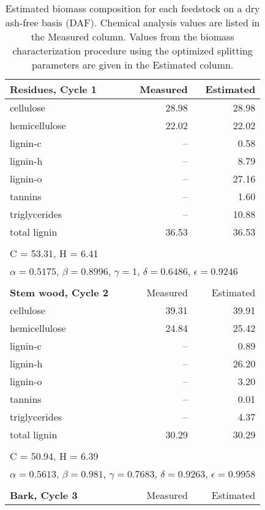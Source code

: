 \begin{longtable}{p{8cm}rr}
    \caption{Estimated biomass composition for each feedstock on a dry ash-free basis (DAF). Chemical analysis values are listed in the Measured column. Values from the biomass characterization procedure using the optimized splitting parameters are given in the Estimated column.}
    \label{tab:biocomp3} \\
    \textbf{Residues, Cycle 1} & Measured & Estimated \\
    \midrule
    cellulose       & 28.98  & 28.98 \\
    hemicellulose   & 22.02  & 22.02 \\
    lignin-c        & --     & 0.58 \\
    lignin-h        & --     & 8.79 \\
    lignin-o        & --     & 27.16 \\
    tannins         & --     & 1.60 \\
    triglycerides   & --     & 10.88 \\
    total lignin    & 36.53  & 36.53 \\
    \\
    \multicolumn{3}{l}{C = 53.31, H = 6.41} \\
    \multicolumn{3}{l}{$\alpha = 0.5175$, $\beta = 0.8996$, $\gamma = 1$, $\delta = 0.6486$, $\epsilon = 0.9246$} \\
    \\
    \textbf{Stem wood, Cycle 2} & Measured & Estimated \\
    \midrule
    cellulose     & 39.31 & 39.91 \\
    hemicellulose & 24.84 & 25.42 \\
    lignin-c      & --    & 0.89 \\
    lignin-h      & --    & 26.20 \\
    lignin-o      & --    & 3.20 \\
    tannins       & --    & 0.01 \\
    triglycerides & --    & 4.37 \\
    total lignin  & 30.29 & 30.29 \\
    \\
    \multicolumn{3}{l}{C = 50.94, H = 6.39} \\
    \multicolumn{3}{l}{$\alpha = 0.5613$, $\beta = 0.981$, $\gamma = 0.7683$, $\delta = 0.9263$, $\epsilon = 0.9958$} \\
    \\
    \textbf{Bark, Cycle 3} & Measured & Estimated \\

\end{longtable}
